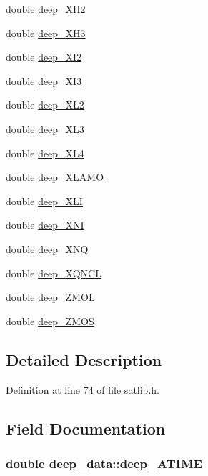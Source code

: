 \begin{DoxyCompactItemize}
\item 
double \hyperlink{structdeep__data_a63280ee1dc5e698456c6a16977179d8c}{deep\-\_\-\-X\-H2}
\item 
double \hyperlink{structdeep__data_aaf8480dd8ac697810f58897ad0d7a2e5}{deep\-\_\-\-X\-H3}
\item 
double \hyperlink{structdeep__data_af2047eab3acd9df1711d8b50012121ba}{deep\-\_\-\-X\-I2}
\item 
double \hyperlink{structdeep__data_aa51f990da4ac7d74cfd1515eea4581fd}{deep\-\_\-\-X\-I3}
\item 
double \hyperlink{structdeep__data_a0edbe1e981578d04f450c07fd8b8c4f1}{deep\-\_\-\-X\-L2}
\item 
double \hyperlink{structdeep__data_a1a7ad4a4863fcdadc6985073e5bc74db}{deep\-\_\-\-X\-L3}
\item 
double \hyperlink{structdeep__data_a61fd91e1b862a41ccf44565bdba236a5}{deep\-\_\-\-X\-L4}
\item 
double \hyperlink{structdeep__data_a87b3fc130401bf4182aed064313ade8c}{deep\-\_\-\-X\-L\-A\-M\-O}
\item 
double \hyperlink{structdeep__data_ae2c68ea75bc04a2ddd058500839946b3}{deep\-\_\-\-X\-L\-I}
\item 
double \hyperlink{structdeep__data_a7bc4544fec52dfd21f3189db105659b1}{deep\-\_\-\-X\-N\-I}
\item 
double \hyperlink{structdeep__data_a9d7f9bc3c1619481c324ea68cd9ddedd}{deep\-\_\-\-X\-N\-Q}
\item 
double \hyperlink{structdeep__data_abc6885cb9b8be05cf0807c87f99c6db3}{deep\-\_\-\-X\-Q\-N\-C\-L}
\item 
double \hyperlink{structdeep__data_a5a6e082590579cfe2583194a031b37a0}{deep\-\_\-\-Z\-M\-O\-L}
\item 
double \hyperlink{structdeep__data_af22009584dacba5c4a3bf97d94692731}{deep\-\_\-\-Z\-M\-O\-S}
\end{DoxyCompactItemize}


\subsection{Detailed Description}


Definition at line 74 of file satlib.\-h.



\subsection{Field Documentation}
\hypertarget{structdeep__data_a87e329466e9fc5dc95bca1bd0cbe036a}{
\subsubsection[{deep\-\_\-\-A\-T\-I\-M\-E}]{\setlength{\rightskip}{0pt plus 5cm}double deep\-\_\-data\-::deep\-\_\-\-A\-T\-I\-M\-E}}\label{structdeep__data_a87e329466e9fc5dc95bca1bd0cbe036a}


